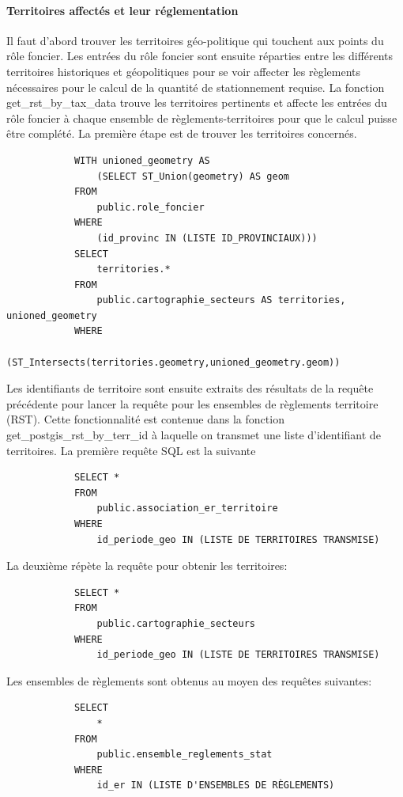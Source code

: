         \paragraph{Territoires affectés et leur réglementation} Il faut d'abord trouver les territoires géo-politique qui touchent aux points du rôle foncier. Les entrées du rôle foncier sont ensuite réparties entre les différents territoires historiques et géopolitiques pour se voir affecter les règlements nécessaires pour le calcul de la quantité de stationnement requise. La fonction get\_rst\_by\_tax\_data trouve les territoires pertinents et affecte les entrées du rôle foncier à chaque ensemble de règlements-territoires pour que le calcul puisse être complété. La première étape est de trouver les territoires concernés.
        \begin{verbatim}
            WITH unioned_geometry AS 
                (SELECT ST_Union(geometry) AS geom 
            FROM 
                public.role_foncier 
            WHERE 
                (id_provinc IN (LISTE ID_PROVINCIAUX)))
            SELECT 
                territories.* 
            FROM 
                public.cartographie_secteurs AS territories, unioned_geometry 
            WHERE 
                (ST_Intersects(territories.geometry,unioned_geometry.geom))
        \end{verbatim}
        Les identifiants de territoire sont ensuite extraits des résultats de la requête précédente pour lancer la requête pour les ensembles de règlements territoire (\ac{RST}). Cette fonctionnalité est contenue dans la fonction get\_postgis\_rst\_by\_terr\_id à laquelle on transmet une liste d'identifiant de territoires. La première requête SQL est la suivante
        \begin{verbatim}
            SELECT * 
            FROM 
                public.association_er_territoire
            WHERE 
                id_periode_geo IN (LISTE DE TERRITOIRES TRANSMISE)
        \end{verbatim}
        La deuxième répète la requête pour obtenir les territoires:
        \begin{verbatim}
            SELECT *
            FROM 
                public.cartographie_secteurs
            WHERE
                id_periode_geo IN (LISTE DE TERRITOIRES TRANSMISE)
        \end{verbatim}
        Les ensembles de règlements sont obtenus au moyen des requêtes suivantes:
        \begin{verbatim}
            SELECT 
                *
            FROM
                public.ensemble_reglements_stat
            WHERE 
                id_er IN (LISTE D'ENSEMBLES DE RÈGLEMENTS)
        \end{verbatim}
